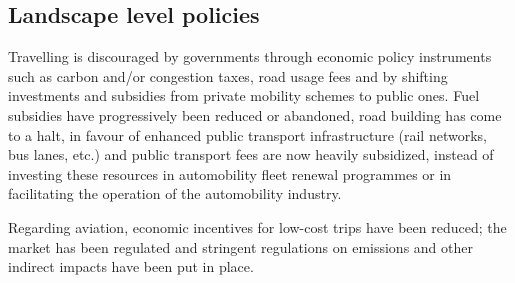 \subsection{Landscape level policies}
\label{ss:results:policies_landscape}

Travelling is discouraged by governments through economic policy instruments such as carbon and/or congestion taxes, road usage fees and by shifting investments and subsidies from private mobility schemes to public ones. Fuel subsidies have progressively been reduced or abandoned, road building has come to a halt, in favour of enhanced public transport infrastructure (rail networks, bus lanes, etc.) and public transport fees are now heavily subsidized, instead of investing these resources in automobility fleet renewal programmes or in facilitating the operation of the automobility industry.

Regarding aviation, economic incentives for low-cost trips have been reduced; the market has been regulated and stringent regulations on emissions and other indirect impacts have been put in place.